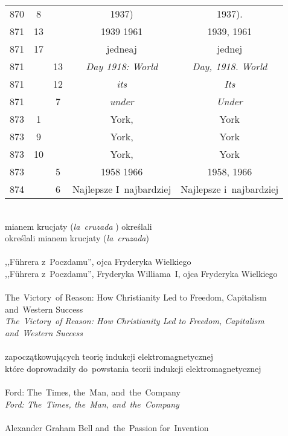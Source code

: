 \documentclass[a4paper,11pt]{article}
\begin{document}
\begin{center}
\begin{tabular}{|c|c|c|c|c|}
    870 &  8 & & 1937) & 1937). \\
    871 & 13 & & 1939 1961 & 1939, 1961 \\
    871 & 17 & & jedneaj & jednej \\
    871 & & 13 & \emph{Day 1918: World} & \emph{Day, 1918. World} \\
    871 & & 12 & \emph{its} & \emph{Its} \\
    871 & &  7 & \emph{under} & \emph{Under} \\
    873 &  1 & & York, & York \\
    873 &  9 & & York, & York \\
    873 & 10 & & York, & York \\
    873 & &  5 & 1958 1966 & 1958, 1966 \\
    874 & &  6 & Najlepsze I~najbardziej & Najlepsze i~najbardziej \\
    \hline
  \end{tabular}
\end{center}
\noi
{} \\
\Jest mianem krucjaty (\emph{la~cruzada} ) określali \\
\Pow  określali mianem krucjaty (\emph{la~cruzada}) \\
 \\
\Jest ,,F\"{u}hrera z~Poczdamu'', ojca Fryderyka Wielkiego \\
\Pow ,,F\"{u}hrera z~Poczdamu'', Fryderyka Williama~I, ojca Fryderyka
Wielkiego \\
 \\
\Jest The~Victory~of Reason: How Christianity Led to Freedom,
Capitalism and~Western Success \\
\Pow \emph{The~Victory~of Reason: How Christianity Led to Freedom,
  Capitalism and~Western Success} \\
 \\
\Jest zapoczątkowujących teorię indukcji elektromagnetycznej \\
\Pow  które doprowadziły do~powstania teorii indukcji elektromagnetycznej \\
 \\
\Jest Ford: The~Times, the~Man, and~the~Company \\
\Pow  \emph{Ford: The~Times, the~Man, and~the~Company} \\
 \\
\Jest Alexander Graham Bell and~the~Passion for~Invention \\
\end{document}
